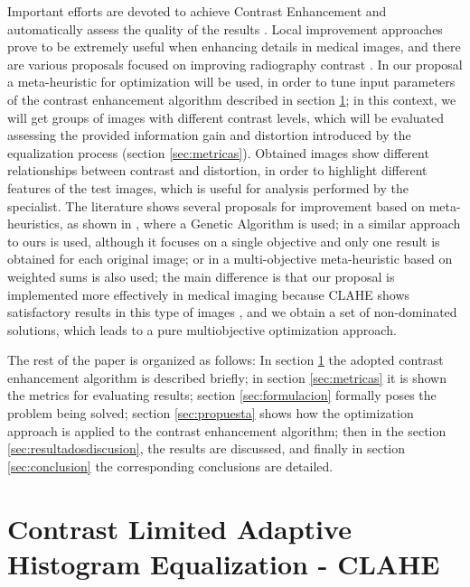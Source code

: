 \documentclass[spanish,twocolumn]{article}
\begin{document}
Important efforts are devoted to achieve Contrast Enhancement and automatically assess the quality of the results \cite{LTG,6963384,1658094,7056527}. Local improvement approaches prove to be extremely useful when enhancing details in medical images, and there are various proposals focused on improving radiography contrast \cite{1625082,4712472,5360176}. In our proposal a meta-heuristic for optimization will be used, in order to tune input parameters of the contrast enhancement algorithm described in section \ref{sec:clahe}; in this context, we will get groups of images with different contrast levels, which will be evaluated assessing the provided information gain and distortion introduced by the equalization process (section \ref{sec:metricas}). Obtained images show different relationships between contrast and distortion, in order to highlight different features of the test images, which is useful for analysis performed by the specialist. The literature shows several proposals for improvement based on meta-heuristics, as shown in \cite{Hashemi20101816}, where a Genetic Algorithm is used; in \cite{morebrizuela2014} a similar approach to ours is used, although it focuses on a single objective and only one result is obtained for each original image; or in \cite{Shanmugavadivu2014243} a multi-objective meta-heuristic based on weighted sums is also used; the main difference is that our proposal is implemented more effectively in medical imaging because CLAHE shows satisfactory results in this type of images \cite{reza2004,5360176}, and we obtain a set of non-dominated solutions, which leads to a pure multiobjective optimization approach.

The rest of the paper is organized as follows: In section \ref{sec:clahe} the adopted contrast enhancement algorithm is described briefly; in section \ref{sec:metricas} it is shown the metrics for evaluating results; section \ref{sec:formulacion} formally poses the problem being solved; section \ref{sec:propuesta} shows how the optimization approach is applied to the contrast enhancement algorithm; then in the section \ref{sec:resultadosdiscusion}, the results are discussed, and finally in section \ref{sec:conclusion} the corresponding conclusions are detailed.


\section{Contrast Limited Adaptive Histogram Equalization - CLAHE}
\label{sec:clahe}
\end{document}
